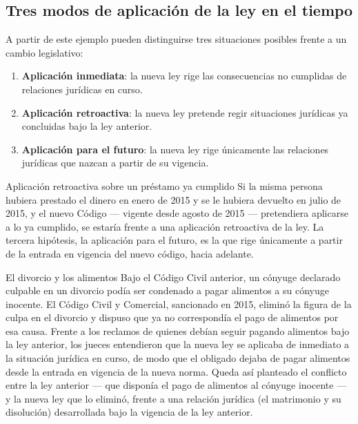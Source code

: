 \documentclass[12pt,oneside]{book}
\begin{document}
\subsection{Tres modos de aplicación de la ley en el tiempo}

A partir de este ejemplo pueden distinguirse tres situaciones posibles frente a un cambio legislativo:

\begin{enumerate}
    \item \textbf{Aplicación inmediata}: la nueva ley rige las consecuencias no cumplidas de relaciones jurídicas en curso.
    \item \textbf{Aplicación retroactiva}: la nueva ley pretende regir situaciones jurídicas ya concluidas bajo la ley anterior.
    \item \textbf{Aplicación para el futuro}: la nueva ley rige únicamente las relaciones jurídicas que nazcan a partir de su vigencia.
\end{enumerate}

\begin{example}{Aplicación retroactiva sobre un préstamo ya cumplido}
Si la misma persona hubiera prestado el dinero en enero de 2015 y se le hubiera devuelto en julio de 2015, y el nuevo Código --- vigente desde agosto de 2015 --- pretendiera aplicarse a lo ya cumplido, se estaría frente a una aplicación retroactiva de la ley. La tercera hipótesis, la aplicación para el futuro, es la que rige únicamente a partir de la entrada en vigencia del nuevo código, hacia adelante.
\end{example}

\begin{example}{El divorcio y los alimentos}
Bajo el Código Civil anterior, un cónyuge declarado culpable en un divorcio podía ser condenado a pagar alimentos a su cónyuge inocente. El Código Civil y Comercial, sancionado en 2015, eliminó la figura de la culpa en el divorcio y dispuso que ya no correspondía el pago de alimentos por esa causa. Frente a los reclamos de quienes debían seguir pagando alimentos bajo la ley anterior, los jueces entendieron que la nueva ley se aplicaba de inmediato a la situación jurídica en curso, de modo que el obligado dejaba de pagar alimentos desde la entrada en vigencia de la nueva norma. Queda así planteado el conflicto entre la ley anterior --- que disponía el pago de alimentos al cónyuge inocente --- y la nueva ley que lo eliminó, frente a una relación jurídica (el matrimonio y su disolución) desarrollada bajo la vigencia de la ley anterior.
\end{example}
\end{document}
